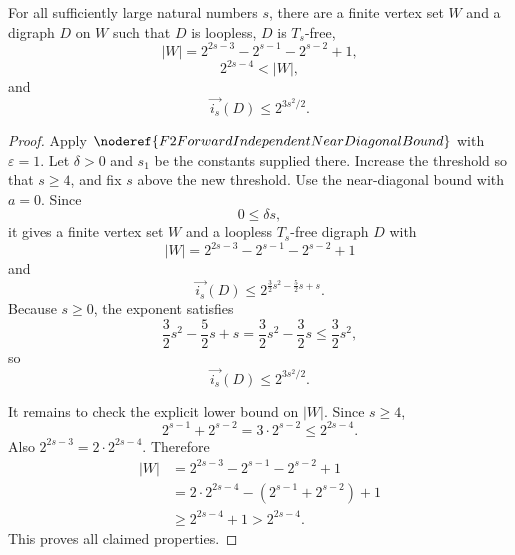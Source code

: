 \begin{helper}
For all sufficiently large natural numbers \(s\), there are a finite vertex set
\(W\) and a digraph \(D\) on \(W\) such that \(D\) is loopless, \(D\) is
\(T_s\)-free,
\[
  |W|=2^{2s-3}-2^{s-1}-2^{s-2}+1,
\]
\[
  2^{2s-4}<|W|,
\]
and
\[
  \overrightarrow{i_s}(D)\le 2^{3s^2/2}.
\]
\end{helper}
\begin{proof}
Apply \(\noderef{F2ForwardIndependentNearDiagonalBound}\) with
\(\varepsilon=1\).  Let \(\delta>0\) and \(s_1\) be the constants supplied
there.  Increase the threshold so that \(s\ge4\), and fix \(s\) above the
new threshold.  Use the near-diagonal bound with \(a=0\).  Since
\[
  0\le \delta s,
\]
it gives a finite vertex set \(W\) and a loopless \(T_s\)-free digraph \(D\)
with
\[
  |W|=2^{2s-3}-2^{s-1}-2^{s-2}+1
\]
and
\[
  \overrightarrow{i_s}(D)
  \le
  2^{\frac32s^2-\frac52s+s}.
\]
Because \(s\ge0\), the exponent satisfies
\[
  \frac32s^2-\frac52s+s
  =
  \frac32s^2-\frac32s
  \le
  \frac32s^2,
\]
so
\[
  \overrightarrow{i_s}(D)\le2^{3s^2/2}.
\]

It remains to check the explicit lower bound on \(|W|\).  Since \(s\ge4\),
\[
  2^{s-1}+2^{s-2}=3\cdot2^{s-2}\le 2^{2s-4}.
\]
Also \(2^{2s-3}=2\cdot2^{2s-4}\).  Therefore
\[
\begin{aligned}
  |W|
  &=2^{2s-3}-2^{s-1}-2^{s-2}+1\\
  &=2\cdot2^{2s-4}-(2^{s-1}+2^{s-2})+1\\
  &\ge 2^{2s-4}+1
  >2^{2s-4}.
\end{aligned}
\]
This proves all claimed properties.
\end{proof}
